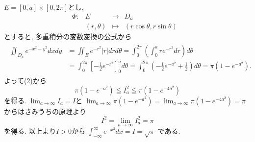 \documentclass[dvipdfmx,a4paper,11pt]{article}
\theoremstyle{definition}
\begin{document}
$E=[0,a]\times[0,2\pi]$とし, 
 $$
\begin{array}{ccccc}
\Phi: &E & \rightarrow & D_a & \\
&(r,\theta) & \longmapsto & (r \cos \theta , r \sin \theta)&
\end{array}
$$
とすると, 多重積分の変数変換の公式から
\begin{align*}
\begin{split}
\iint_{D_a} e^{-x^2 - y^2} dxdy 
&=
\iint_{E} e^{- r^2}|r|drd\theta =
\int_{0}^{2\pi} \left( \int_{0}^{a} re^{- r^2} dr\right)d\theta \\
&=\int_{0}^{2\pi} \left[  -\frac{1}{2} e^{- r^2}\right]_{0}^{a} d\theta 
=\int_{0}^{2\pi} \left(  -\frac{1}{2} e^{- a^2} + \frac{1}{2} \right) d\theta 
=\pi \left( 1 -  e^{- a^2}\right).
    \end{split}
  \end{align*}
よって(2)から
$$
\pi \left( 1 -  e^{- a^2}\right)
\leqq I_{a}^{2}
\leqq \pi \left( 1 -  e^{- 4a^2}\right)
$$
を得る. $\lim_{a \rightarrow \infty} I_a = I$と 
$\lim_{a \rightarrow \infty} \pi \left( 1 -  e^{- a^2}\right) = \lim_{a \rightarrow \infty} \pi \left( 1 -  e^{- 4a^2}\right)=\pi$
からはさみうちの原理より
$$
I^2 = \lim_{a \rightarrow \infty} I_{a}^{2}  =  \pi
$$
を得る. 以上より$I>0$から
$
\int_{-\infty}^{\infty} e^{- x^2} dx = I = \sqrt{\pi}
$
である. 

\vspace{33pt}
\end{document}
